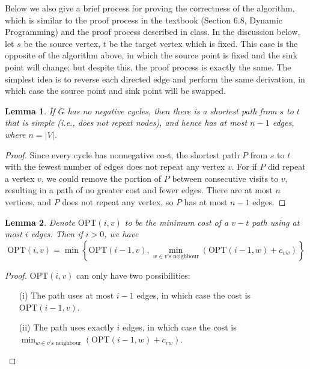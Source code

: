 \documentclass[11pt]{article}
\theoremstyle{plain}
\newtheorem{lemma}{Lemma}[section]
\begin{document}
  Below we also give a brief process for proving the correctness of the algorithm, which is similar to
  the proof process in the textbook (Section 6.8, Dynamic Programming) and the proof process described in class.
  In the discussion below, let $s$ be the source vertex, $t$ be the target vertex which is fixed. 
  This case is the opposite of the algorithm above, in which the source point is fixed and the sink point 
  will change; but despite this, the proof process is exactly the same. The simplest idea is to reverse each 
  directed edge and perform the same derivation, in which case the source point and sink point will be swapped.

  \begin{lemma}
    If $G$ has no negative cycles, then there is a shortest path from $s$ to $t$
    that is simple (i.e., does not repeat nodes), and hence has at most $n-1$ edges, where $n = |V|$.
  \end{lemma}

  \begin{proof}
    Since every cycle has nonnegative cost, the shortest path $P$ from $s$ to
    $t$ with the fewest number of edges does not repeat any vertex $v$. For if $P$ did
    repeat a vertex $v$, we could remove the portion of $P$ between consecutive visits
    to $v$, resulting in a path of no greater cost and fewer edges. There are at most 
    $n$ vertices, and $P$ does not repeat any vertex, so $P$ has at most $n-1$ edges.
  \end{proof}

  \begin{lemma}
    Denote $\text{OPT}(i, v)$ to be the minimum cost of a $v-t$ path using at most
    $i$ edges. Then if $i > 0$, we have
    \[
      \text{OPT}(i, v) =\min\left\{ \text{OPT}(i-1, v),\min_{w \in v\text{'s neighbour}}(\text{OPT}(i-1, w) + c_{vw}) \right\} 
    \]
  \end{lemma}

  \begin{proof}
    $\text{OPT}(i, v)$ can only have two possibilities: 
    \begin{itemize}
      \item[(i)] The path uses at most $i-1$ edges, in which case the cost is $\text{OPT}(i-1, v)$.
      \item[(ii)] The path uses exactly $i$ edges, in which case the cost is $\min_{w \in v\text{'s neighbour}}(\text{OPT}(i-1, w) + c_{vw})$.
    \end{itemize}
  \end{proof}
\end{document}
